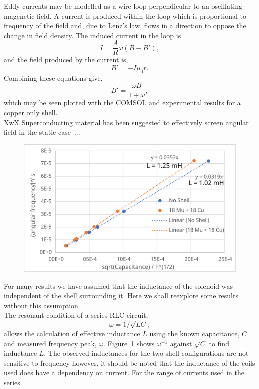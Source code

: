 \documentclass[11pt]{iopart}
\begin{document}
Eddy currents may be modelled as a wire loop perpendicular to an
oscillating magenetic field. A current is produced within the loop
which is proportional to frequency of the field and, due to Lenz's
law, flows in a direction to oppose the change in field density. The
induced current in the loop is
$$ I = \frac{A}{R}\omega (B - B'), $$
and the field produced by the current is,
$$ B' = -I \mu_0 r. $$
Combining these equations give,
$$ B' = \frac{\omega B}{1+\omega}, $$
which may be seen plotted with the COMSOL and experimental results for
a copper only shell.\\

XwX Superconducting material has been suggested to effectively screen
angular field in the static case~\cite{XXX}... \\

\begin{figure}
  \begin{center}
   \noindent\includegraphics[width=0.75\linewidth]{images/inductance.pdf}
  \end{center}
  \caption{}\label{fig:inductance}
\end{figure}
For many results we have assumed that the inductance of the solenoid
was independent of the shell surrounding it. Here we shall reexplore
some results without this assumption. \\ The resonant condition of a
series RLC circuit,
\begin{equation}
  \label{eqn:RLC}
  \omega = 1/\sqrt{LC},
\end{equation}
allows the calculation of effective inductance $L$ using the known
capacitance, $C$ and measured frequency peak,
$\omega$. Figure~\ref{fig:inductance} shows $\omega^{-1}$ against
$\sqrt{C}$ to find inductance $L$. The observed inductances for the
two shell configurations are not sensitive to frequency however, it
should be noted that the inductance of the coils used does have a
dependency on current. For the range of currents used in the series
\end{document}
